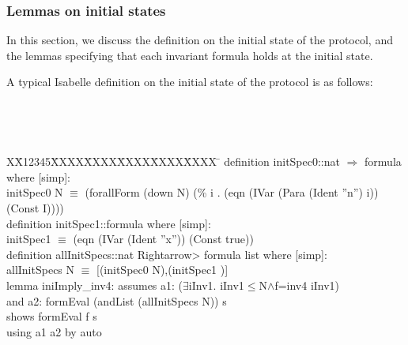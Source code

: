 \documentclass{llncs}
\newlength{\fminilength}
\newenvironment{fmini}[1][\linewidth]
  {\setlength{\fminilength}{#1\fboxsep-2\fboxrule}%
   \vspace{2ex}\noindent\begin{lrbox}{\fminibox}\begin{minipage}{\fminilength}%
   \mbox{ }\hfill\vspace{-2.5ex}}%
  {\end{minipage}\end{lrbox}\vspace{1ex}\hspace{0ex}%
   \framebox{\usebox{\fminibox}}}
\newenvironment{specification}
{\noindent\scriptsize
\tt\begin{fmini}\begin{tabbing}X\=X12345\=XXXX\=XXXX\=XXXX\=XXXX\=XXXX
\=\+\kill} {\end{tabbing}\normalfont\end{fmini}}
\def \twoSpaces {\ \ }
\def \iInv {iInv}
\begin{document}
\subsubsection{Lemmas on initial states}

In this section, we discuss the definition on the initial state of the protocol, and the lemmas specifying that each invariant formula holds at the initial state.

A typical Isabelle definition on the initial state of the protocol is as follows:

\begin{specification}
definition initSpec0::nat $\Rightarrow$ formula where [simp]:\\
initSpec0 N $\equiv$ (forallForm (down N) (\% i . (eqn (IVar (Para (Ident ''n'') i)) (Const I))))\\

definition initSpec1::formula where [simp]:\\
initSpec1  $\equiv$ (eqn (IVar (Ident ''x'')) (Const true))\\

definition allInitSpecs::nat \<Rightarrow> formula list where [simp]:\\
allInitSpecs N $\equiv$ [(initSpec0 N),(initSpec1 )]\\

lemma iniImply\_inv4:
assumes a1: ($\exists$\iInv1. \iInv1$\le$N$\wedge$f=inv4 \iInv1)\\
and a2: formEval (andList (allInitSpecs N)) s\\
shows formEval f s\\
 using a1 a2 by auto\\
\end{specification}
\end{document}
